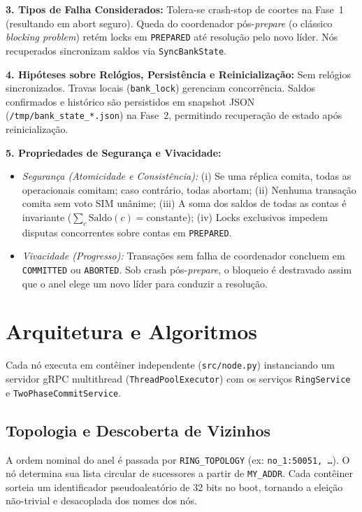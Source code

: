 \documentclass[conference]{IEEEtran}
\begin{document}
\textbf{3. Tipos de Falha Considerados:} Tolera-se crash-stop de coortes na Fase~1 (resultando em abort seguro). Queda do coordenador pós-\textit{prepare} (o clássico \textit{blocking problem}) retém locks em \texttt{PREPARED} até resolução pelo novo líder. Nós recuperados sincronizam saldos via \texttt{SyncBankState}.

\textbf{4. Hipóteses sobre Relógios, Persistência e Reinicialização:} Sem relógios sincronizados. Travas locais (\texttt{bank\_lock}) gerenciam concorrência. Saldos confirmados e histórico são persistidos em snapshot JSON (\texttt{/tmp/bank\_state\_*.json}) na Fase~2, permitindo recuperação de estado após reinicialização.

\textbf{5. Propriedades de Segurança e Vivacidade:}
\begin{itemize}
  \item \textit{Segurança (Atomicidade e Consistência):} (i) Se uma réplica comita, todas as operacionais comitam; caso contrário, todas abortam; (ii) Nenhuma transação comita sem voto SIM unânime; (iii) A soma dos saldos de todas as contas é invariante ($\sum_{c} \text{Saldo}(c) = \text{constante}$); (iv) Locks exclusivos impedem disputas concorrentes sobre contas em \texttt{PREPARED}.
  \item \textit{Vivacidade (Progresso):} Transações sem falha de coordenador concluem em \texttt{COMMITTED} ou \texttt{ABORTED}. Sob crash pós-\textit{prepare}, o bloqueio é destravado assim que o anel elege um novo líder para conduzir a resolução.
\end{itemize}

\section{Arquitetura e Algoritmos}
Cada nó executa em contêiner independente (\texttt{src/node.py}) instanciando um servidor gRPC multithread (\texttt{ThreadPoolExecutor}) com os serviços \texttt{RingService} e \texttt{TwoPhaseCommitService}.

\subsection{Topologia e Descoberta de Vizinhos}
A ordem nominal do anel é passada por \texttt{RING\_TOPOLOGY} (ex: \texttt{no\_1:50051, \dots}). O nó determina sua lista circular de sucessores a partir de \texttt{MY\_ADDR}. Cada contêiner sorteia um identificador pseudoaleatório de 32 bits no boot, tornando a eleição não-trivial e desacoplada dos nomes dos nós.
\end{document}
